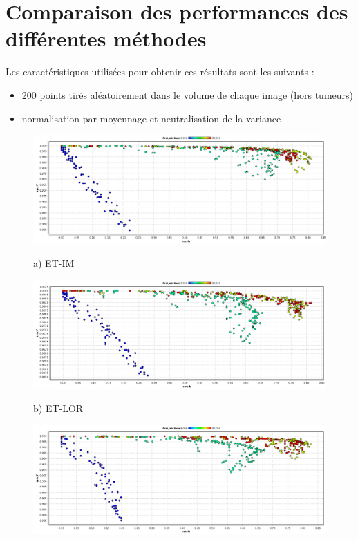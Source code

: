 \section{Comparaison des performances des différentes méthodes}

Les caractéristiques utilisées pour obtenir ces résultats sont les suivants :

\begin{itemize}
 \item 200 points tirés aléatoirement dans le volume de chaque image (hors tumeurs)
 \item normalisation par moyennage et neutralisation de la variance 
\end{itemize}


\begin{figure}[h!]

\begin{center}
 \includegraphics[width=14cm]{images/pareto_mod_IM.png}

{\small a) ET-IM}
\vspace{0.5cm}

\includegraphics[width=14cm]{images/pareto_mod_LOR.png}
 
{\small b) ET-LOR}
\vspace{0.5cm}

\includegraphics[width=14cm]{images/pareto_mod_NoCorr.png}


\end{center}
\end{figure}
